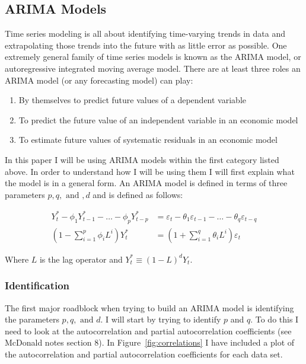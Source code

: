 \documentclass[a4paper, 11pt]{article}
\newcommand\ve{\varepsilon} %
\theoremstyle{definition} %
\numberwithin{equation}{section}
\begin{document}
  \newpage
  \subsection{ARIMA Models} \label{sub:arima}

    Time series modeling is all about identifying time-varying trends in data and extrapolating those trends into the future with as little error as possible. One extremely general family of time series models is known as the ARIMA model, or autoregressive integrated moving average model. There are at least three roles an ARIMA model (or any forecasting model) can play:

    \begin{enumerate}
      \item By themselves to predict future values of a dependent variable
      \item To predict the future value of an independent variable in an economic model
      \item To estimate future values of systematic residuals in an economic model
    \end{enumerate}

    In this paper I will be using ARIMA models within the first category listed above. In order to understand how I will be using them I will first explain what the model is in a general form. An ARIMA model is defined in terms of three parameters $p, q, \text{ and }, d$ and is defined as follows:

     \begin{align}
     Y_t^* - \phi_1Y_{t-1}^*  - \dots - \phi_pY_{t-p}^* &= \ve_t - \theta_1\ve_{t-1} - \dots - \theta_q \ve_{t-q} \label{eq:arimalong}\\
     \left( 1 - \sum_{i=1}^p \phi_i L^i\right) Y_t^* &= \left( 1 + \sum_{i=1} ^q \theta_i L^i \right) \ve_t \label{eq:arima}
     \end{align}

    Where $L$ is the lag operator and $Y_t^* \equiv (1 - L)^d Y_t$.

    \subsubsection{Identification} \label{ssub:identification}

      The first major roadblock when trying to build an ARIMA model is identifying the parameters $p, q, \text{ and } d$. I will start by trying to identify $p$ and $q$. To do this I need to look at the autocorrelation and partial autocorrelation coefficients (see McDonald notes section 8). In Figure~\ref{fig:correlations} I have included a plot of the autocorrelation and partial autocorrelation coefficients for each data set.
\end{document}
